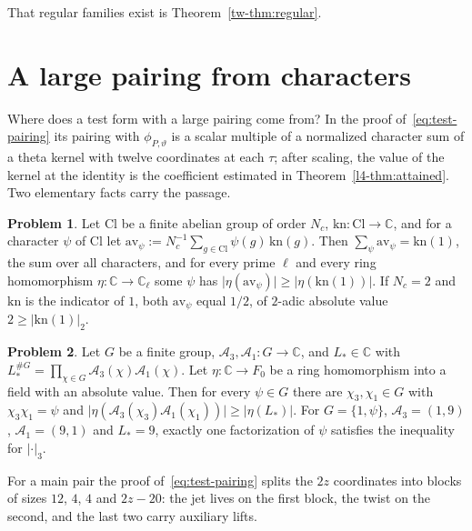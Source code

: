 \documentclass[reqno]{amsart}
\theoremstyle{definition}
\newtheorem{problem}{Problem}[section]
\theoremstyle{plain}
\theoremstyle{remark}
\newcommand{\C}{\mathbb{C}}
\newcommand{\Cl}{\mathrm{Cl}}
\begin{document}
That regular families exist is Theorem~\ref{tw-thm:regular}.

\section{A large pairing from characters}\label{sec:large}

Where does a test form with a large pairing come from?  In the proof of~\eqref{eq:test-pairing} its pairing with \(\phi_{P,\vartheta}\) is a scalar multiple of a normalized character sum of a theta kernel with twelve coordinates at each \(\tau\); after scaling, the value of the kernel at the identity is the coefficient estimated in Theorem~\ref{l4-thm:attained}.  Two elementary facts carry the passage.

\begin{problem}\label{pr:orthogonality}
Let \(\Cl\) be a finite abelian group of order \(N_c\), \(\mathrm{kn}\colon \Cl \to \C\), and for a character \(\psi\) of \(\Cl\) let \(\mathrm{av}_\psi := N_c^{-1}\sum_{g \in \Cl}\psi(g)\,\mathrm{kn}(g)\).  Then \(\sum_\psi \mathrm{av}_\psi = \mathrm{kn}(1)\), the sum over all characters, and for every prime \(\ell\) and every ring homomorphism \(\eta\colon\C\to\C_\ell\) some \(\psi\) has \(\lvert\eta(\mathrm{av}_\psi)\rvert \ge \lvert\eta(\mathrm{kn}(1))\rvert\).  If \(N_c = 2\) and \(\mathrm{kn}\) is the indicator of \(1\), both \(\mathrm{av}_\psi\) equal \(1/2\), of \(2\)-adic absolute value \(2 \ge \lvert\mathrm{kn}(1)\rvert_2\).
\end{problem}

\begin{problem}\label{pr:pigeonhole}
Let \(G\) be a finite group, \(\mathcal A_3, \mathcal A_1\colon G \to \C\), and \(L_* \in \C\) with \(L_*^{\#G} = \prod_{\chi \in G} \mathcal A_3(\chi)\mathcal A_1(\chi)\).  Let \(\eta\colon\C\to F_0\) be a ring homomorphism into a field with an absolute value.  Then for every \(\psi \in G\) there are \(\chi_3, \chi_1 \in G\) with \(\chi_3\chi_1 = \psi\) and \(\lvert\eta(\mathcal A_3(\chi_3)\mathcal A_1(\chi_1))\rvert \ge \lvert\eta(L_*)\rvert\).  For \(G = \{1, \psi\}\), \(\mathcal A_3 = (1, 9)\), \(\mathcal A_1 = (9, 1)\) and \(L_* = 9\), exactly one factorization of \(\psi\) satisfies the inequality for \(\lvert\cdot\rvert_3\).
\end{problem}

For a main pair the proof of~\eqref{eq:test-pairing} splits the \(2z\) coordinates into blocks of sizes \(12\), \(4\), \(4\) and \(2z - 20\): the jet lives on the first block, the twist on the second, and the last two carry auxiliary lifts.
\end{document}
